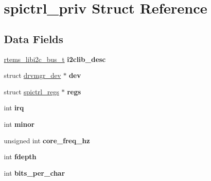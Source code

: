 \hypertarget{structspictrl__priv}{}\section{spictrl\+\_\+priv Struct Reference}
\label{structspictrl__priv}
\subsection*{Data Fields}
\begin{DoxyCompactItemize}
\item 
\mbox{\label{structspictrl__priv_a6e55451f53fceffadcd6e044b7a861c9}} 
\mbox{\hyperlink{structrtems__libi2c__bus__t__}{rtems\+\_\+libi2c\+\_\+bus\+\_\+t}} {\bfseries i2clib\+\_\+desc}
\item 
\mbox{\label{structspictrl__priv_a465f472b0e16ac0785903d9cf3db4638}} 
struct \mbox{\hyperlink{structdrvmgr__dev}{drvmgr\+\_\+dev}} $\ast$ {\bfseries dev}
\item 
\mbox{\label{structspictrl__priv_a252a4e493127efe742fc9740bb06c77b}} 
struct \mbox{\hyperlink{structspictrl__regs}{spictrl\+\_\+regs}} $\ast$ {\bfseries regs}
\item 
\mbox{\label{structspictrl__priv_abae67d9dd10d20bdf8c771e6b550d2e4}} 
int {\bfseries irq}
\item 
\mbox{\label{structspictrl__priv_a6a632cff7fb16f64196d957b261821f0}} 
int {\bfseries minor}
\item 
\mbox{\label{structspictrl__priv_a1e25b8873258a4578294f6bc41bf7de6}} 
unsigned int {\bfseries core\+\_\+freq\+\_\+hz}
\item 
\mbox{\label{structspictrl__priv_a84d97619038a34c47984f080aeba6899}} 
int {\bfseries fdepth}
\item 
\mbox{\label{structspictrl__priv_ade62ff0114aa2ae23596905fb3fcb60d}} 
int {\bfseries bits\+\_\+per\+\_\+char}
\item 
\mbox{\label{structspictrl__priv_a7160662fc1e007f14d9b1cdab2bb807d}} 

\end{DoxyCompactItemize}
